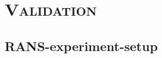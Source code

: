 \documentclass[xcolor=x11names,compress]{beamer}
\renewcommand{\(}{\begin{columns}}
\renewcommand{\)}{\end{columns}}
\newcommand{\<}[1]{\begin{column}{#1}}
\renewcommand{\>}{\end{column}}
\begin{document}
\section{\scshape Validation}

\subsection{RANS-experiment-setup}
	
\end{document}
